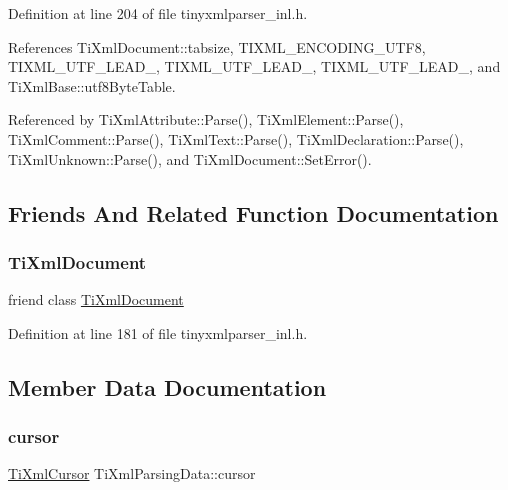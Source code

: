 Definition at line 204 of file tinyxmlparser\+\_\+inl.\+h.



References Ti\+Xml\+Document\+::tabsize, T\+I\+X\+M\+L\+\_\+\+E\+N\+C\+O\+D\+I\+N\+G\+\_\+\+U\+T\+F8, T\+I\+X\+M\+L\+\_\+\+U\+T\+F\+\_\+\+L\+E\+A\+D\+\_, T\+I\+X\+M\+L\+\_\+\+U\+T\+F\+\_\+\+L\+E\+A\+D\+\_, T\+I\+X\+M\+L\+\_\+\+U\+T\+F\+\_\+\+L\+E\+A\+D\+\_, and Ti\+Xml\+Base\+::utf8\+Byte\+Table.



Referenced by Ti\+Xml\+Attribute\+::\+Parse(), Ti\+Xml\+Element\+::\+Parse(), Ti\+Xml\+Comment\+::\+Parse(), Ti\+Xml\+Text\+::\+Parse(), Ti\+Xml\+Declaration\+::\+Parse(), Ti\+Xml\+Unknown\+::\+Parse(), and Ti\+Xml\+Document\+::\+Set\+Error().



\subsection{Friends And Related Function Documentation}
\hypertarget{class_ti_xml_parsing_data_a173617f6dfe902cf484ce5552b950475}{}\label{class_ti_xml_parsing_data_a173617f6dfe902cf484ce5552b950475} 
\subsubsection{\texorpdfstring{Ti\+Xml\+Document}{TiXmlDocument}}
{\footnotesize\ttfamily friend class \hyperlink{class_ti_xml_document}{Ti\+Xml\+Document}\hspace{0.3cm}{\ttfamily [friend]}}



Definition at line 181 of file tinyxmlparser\+\_\+inl.\+h.



\subsection{Member Data Documentation}
\hypertarget{class_ti_xml_parsing_data_abee4c6c657f595182a4f8beda4fa1c7d}{}\label{class_ti_xml_parsing_data_abee4c6c657f595182a4f8beda4fa1c7d} 
\subsubsection{\texorpdfstring{cursor}{cursor}}
{\footnotesize\ttfamily \hyperlink{struct_ti_xml_cursor}{Ti\+Xml\+Cursor} Ti\+Xml\+Parsing\+Data\+::cursor\hspace{0.3cm}{\ttfamily [private]}}



